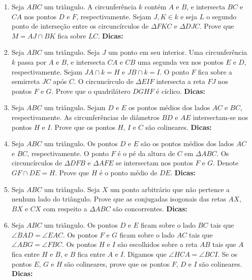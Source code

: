 \documentclass{article}
\newcommand{\dica}{\textbf{Dicas:}}
\newcommand{\iniTri}{Seja $ABC$ um triângulo}
\begin{document}
\begin{multicols}{2}
\begin{enumerate}
    \item \iniTri. A circunferência $k$ contém $A$ e $B$, e intersecta $BC$ e $CA$ nos pontos $D$ e $F$, respectivamente. Sejam $J, K \in k$ e seja $L$ o segundo ponto de interseção entre os circuncírculos de $\Delta FKC$ e $\Delta DJC$. Prove que $M=AJ\cap BK$ fica sobre $LC$. \dica %
    
    \item \iniTri. Seja $J$ um ponto em seu interior. Uma circunferência $k$ passa por $A$ e $B$, e intersecta $CA$ e $CB$ uma segunda vez nos pontos $E$ e $D$, respectivamente. Sejam $JA\cap k=H$ e $JB\cap k=I$. O ponto $F$ fica sobre a semirreta $JC$ após $C$. O circuncírculo de $\Delta EIF$ intersecta a reta $FJ$ nos pontos $F$ e $G$. Prove que o quadrilátero $DGHF$ é cíclico. \dica %
    
    \item \iniTri. Sejam $D$ e $E$ os pontos médios dos lados $AC$ e $BC$, respectivamente. As circunferências de diâmetros $BD$ e $AE$ intersectam-se nos pontos $H$ e $I$. Prove que os pontos $H$, $I$ e $C$ são colineares. \dica %
    
    \item \iniTri. Os pontos $D$ e $E$ são os pontos médios dos lados $AC$ e $BC$, respectivamente. O ponto $F$ é o pé da altura de $C$ em $\Delta ABC$. Os circuncírculos de $\Delta DFB$ e $\Delta AFE$ se intersectam nos pontos $F$ e $G$. Denote $GF\cap DE=H$. Prove que $H$ é o ponto médio de $DE$. \dica %
    
    \item \iniTri. Seja $X$ um ponto arbitrário que não pertence a nenhum lado do triângulo. Prove que as conjugadas isogonais das retas $AX$, $BX$ e $CX$ com respeito a $\Delta ABC$ são concorrentes. \dica %
    
    \item \iniTri. Os pontos $D$ e $E$ ficam sobre o lado $BC$ tais que $\angle BAD=\angle EAC$. Os pontos $F$ e $G$ ficam sobre o lado $AC$ tais que $\angle ABG=\angle FBC$. Os pontos $H$ e $I$ são escolhidos sobre a reta $AB$ tais que $A$ fica entre $H$ e $B$, e $B$ fica entre $A$ e $I$. Digamos que $\angle HCA=\angle BCI$. Se os pontos $E$, $G$ e $H$ são colineares, prove que os pontos $F$, $D$ e $I$ são colineares. \dica %
    

\end{enumerate}
\end{multicols}
\end{document}
